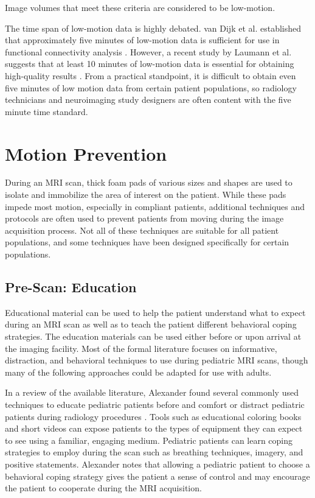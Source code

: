 Image volumes that meet these criteria are considered to be low-motion.

The time span of low-motion data is highly debated. van Dijk et al. established that approximately five minutes of low-motion data is sufficient for use in functional connectivity analysis \cite{VanDijk2012}. However, a recent study by Laumann et al. suggests that at least 10 minutes of low-motion data is essential for obtaining high-quality results \cite{Laumann2015}. From a practical standpoint, it is difficult to obtain even five minutes of low motion data from certain patient populations, so radiology technicians and neuroimaging study designers are often content with the five minute time standard. 

\section{Motion Prevention}

During an MRI scan, thick foam pads of various sizes and shapes are used to isolate and immobilize the area of interest on the patient. While these pads impede most motion, especially in compliant patients, additional techniques and protocols are often used to prevent patients from moving during the image acquisition process. Not all of these techniques are suitable for all patient populations, and some techniques have been designed specifically for certain populations.

\subsection{Pre-Scan: Education}

Educational material can be used to help the patient understand what to expect during an MRI scan as well as to teach the patient different behavioral coping strategies. The education materials can be used either before or upon arrival at the imaging facility. Most of the formal literature focuses on informative, distraction, and behavioral techniques to use during pediatric MRI scans, though many of the following approaches could be adapted for use with adults.

In a review of the available literature, Alexander found several commonly used techniques to educate pediatric patients before and comfort or distract pediatric patients during radiology procedures \cite{Alexander2012}. Tools such as educational coloring books and short videos can expose patients to the types of equipment they can expect to see using a familiar, engaging medium. Pediatric patients can learn coping strategies to employ during the scan such as breathing techniques, imagery, and positive statements. Alexander notes that allowing a pediatric patient to choose a behavioral coping strategy gives the patient a sense of control and may encourage the patient to cooperate during the MRI acquisition.

